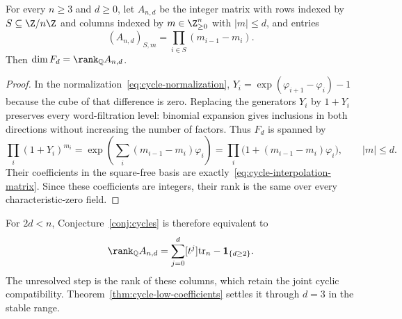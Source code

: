 \begin{proposition}
\label{prop:cycle-interpolation}
For every $n\ge3$ and $d\ge0$, let $A_{n,d}$ be the integer matrix with
rows indexed by $S\subseteq\Z/n\Z$ and columns indexed by
$m\in\Z_{\ge0}^n$ with $|m|\le d$, and entries
\begin{equation}\label{eq:cycle-interpolation-matrix}
 (A_{n,d})_{S,m}=\prod_{i\in S}(m_{i-1}-m_i).
\end{equation}
Then $\dim F_d=\rank_{\mathbb Q}A_{n,d}$.
\end{proposition}
\begin{proof}
In the normalization~\eqref{eq:cycle-normalization},
$Y_i=\exp(\varphi_{i+1}-\varphi_i)-1$ because the cube of that difference
is zero. Replacing the generators $Y_i$ by $1+Y_i$ preserves every
word-filtration level: binomial expansion gives inclusions in both
directions without increasing the number of factors. Thus $F_d$ is
spanned by
\[
 \prod_i(1+Y_i)^{m_i} =\exp\!\left(\sum_i(m_{i-1}-m_i)\varphi_i\right)
 =\prod_i\bigl(1+(m_{i-1}-m_i)\varphi_i\bigr),\qquad |m|\le d.
\]
Their coefficients in the square-free basis are exactly~\eqref{eq:cycle-interpolation-matrix}.
Since these coefficients are integers, their rank is the same over every characteristic-zero field.
\end{proof}

For $2d<n$, Conjecture~\ref{conj:cycles} is therefore equivalent to
\[
 \rank_{\mathbb Q}A_{n,d}
 =\sum_{j=0}^d[t^j]\mathrm{tr}_n-\mathbf1_{\{d\ge2\}}.
\]
The unresolved step is the rank of these columns, which retain the
joint cyclic compatibility. Theorem~\ref{thm:cycle-low-coefficients}
settles it through $d=3$ in the stable range.

